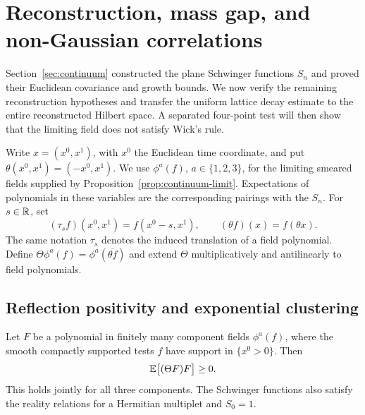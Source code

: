 \section{Reconstruction, mass gap, and non-Gaussian correlations}
\label{sec:os}

Section~\ref{sec:continuum} constructed the plane Schwinger functions
$S_n$ and proved their Euclidean covariance and growth bounds.  We now
verify the remaining reconstruction hypotheses and transfer the uniform
lattice decay estimate to the entire reconstructed Hilbert space.  A
separated four-point test will then show that the limiting field does not
satisfy Wick's rule.

Write $x=(x^0,x^1)$, with $x^0$ the Euclidean time coordinate, and put
$\theta(x^0,x^1)=(-x^0,x^1)$.  We use $\phi^a(f)$, $a\in\{1,2,3\}$, for
the limiting smeared fields supplied by
Proposition~\ref{prop:continuum-limit}.  Expectations of polynomials in
these variables are the corresponding pairings with the $S_n$.
For $s\in\mathbb R$, set
\[
 (\tau_s f)(x^0,x^1)=f(x^0-s,x^1),
 \qquad (\theta f)(x)=f(\theta x).
\]
The same notation $\tau_s$ denotes the induced translation of a field
polynomial.  Define $\Theta\phi^a(f)=\phi^a(\overline{\theta f})$ and
extend $\Theta$ multiplicatively and antilinearly to field polynomials.

\subsection{Reflection positivity and exponential clustering}

\begin{lemma}
\label{lem:reflection-positivity}
Let $F$ be a polynomial in finitely many component fields
$\phi^a(f)$, where the smooth compactly supported tests $f$ have support
in $\{x^0>0\}$.  Then
\begin{equation}
 \mathbb E\bigl[(\Theta F)F\bigr]\ge0.
 \label{eq:continuum-reflection-positivity}
\end{equation}
This holds jointly for all three components.  The Schwinger functions
also satisfy the reality relations for a Hermitian multiplet and
$S_0=1$.
\end{lemma}

